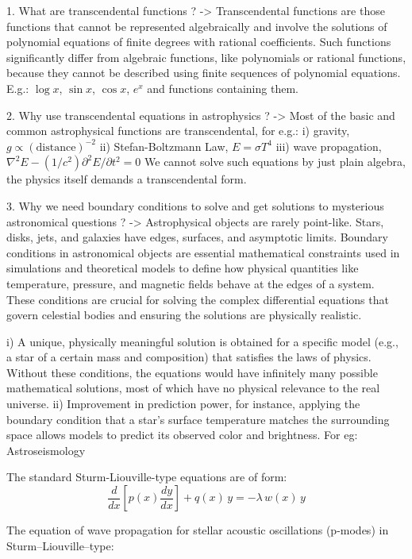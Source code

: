 1.  What are transcendental functions ?
    ->  Transcendental functions are those functions that cannot be represented algebraically and involve the solutions of
    polynomial equations of finite degrees with rational coefficients. Such functions significantly differ from algebraic
    functions, like polynomials or rational functions, because they cannot be described using finite sequences of polynomial
    equations. E.g.: \( \log x \), \( \sin x \), \( \cos x \), \( e^x \) and functions containing them.

2.  Why use transcendental equations in astrophysics ?
    -> Most of the basic and common astrophysical functions are transcendental, for e.g.:
    i)  gravity, \( g \propto (\text{distance})^{-2} \)
    ii) Stefan-Boltzmann Law, \( E = \sigma T^4 \)
    iii) wave propagation, \( \nabla^2 E - (1/c^2)\partial^2 E/\partial t^2 = 0 \)
    We cannot solve such equations by just plain algebra, the physics itself demands a transcendental form.

3.  Why we need boundary conditions to solve and get solutions to mysterious astronomical questions ?
    -> Astrophysical objects are rarely point-like. Stars, disks, jets, and galaxies have edges, surfaces, and asymptotic limits.
    Boundary conditions in astronomical objects are essential mathematical constraints used in simulations and theoretical
    models to define how physical quantities like temperature, pressure, and magnetic fields behave at the edges of a system.
    These conditions are crucial for solving the complex differential equations that govern celestial bodies and ensuring the
    solutions are physically realistic.

    i) A unique, physically meaningful solution is obtained for a specific model (e.g., a star of a certain mass and composition)
     that satisfies the laws of physics. Without these conditions, the equations would have infinitely many possible
     mathematical solutions, most of which have no physical relevance to the real universe.
    ii) Improvement in prediction power, for instance, applying the boundary condition that a star's surface temperature matches
     the surrounding space allows models to predict its observed color and brightness.
    For eg:
        Astroseismology

        The standard Sturm-Liouville-type equations are of form:
        $$
        \frac{d}{dx}\left[p(x)\frac{dy}{dx}\right] + q(x)\,y = -\lambda\, w(x)\,y
        $$

        The equation of wave propagation for stellar acoustic oscillations (p-modes) in Sturm–Liouville–type:

